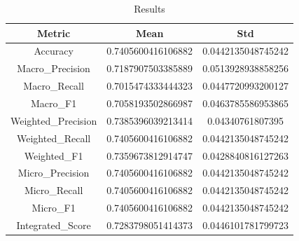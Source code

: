 \begin{table}[htbp]
\centering
\caption{Results}
\label{tab:csv}
\small
\setlength{\tabcolsep}{4pt}
\begin{tabular}{|c|c|c|}
\hline
Metric & Mean & Std \\
\hline
Accuracy & 0.7405600416106882 & 0.0442135048745242 \\
Macro_Precision & 0.7187907503385889 & 0.0513928938858256 \\
Macro_Recall & 0.7015474333444323 & 0.0447720993200127 \\
Macro_F1 & 0.7058193502866987 & 0.0463785586953865 \\
Weighted_Precision & 0.7385396039213414 & 0.04340761807395 \\
Weighted_Recall & 0.7405600416106882 & 0.0442135048745242 \\
Weighted_F1 & 0.7359673812914747 & 0.0428840816127263 \\
Micro_Precision & 0.7405600416106882 & 0.0442135048745242 \\
Micro_Recall & 0.7405600416106882 & 0.0442135048745242 \\
Micro_F1 & 0.7405600416106882 & 0.0442135048745242 \\
Integrated_Score & 0.7283798051414373 & 0.0446101781799723 \\
\hline
\end{tabular}
\end{table}